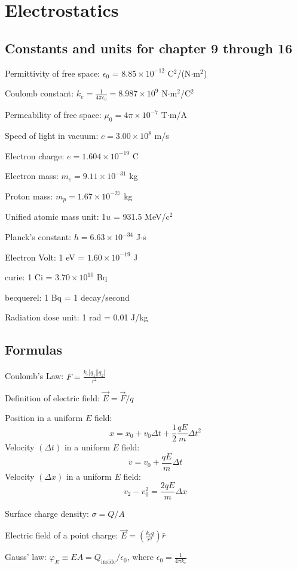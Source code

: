 \documentclass[../physics12.tex]{subfiles}
\begin{document}
\chapter{Electrostatics}
\section{Constants and units for chapter 9 through 16}
Permittivity of free space: $\epsilon_0$ = $8.85\times 10^{-12}$ C$^2$/(N$\cdot$m$^2$)

Coulomb constant: $k_e = \frac{1}{4\pi\epsilon_0} = 8.987\times 10^9$ N$\cdot$m$^2$/C$^2$

Permeability of free space: $\mu_0 = 4\pi\times 10^{-7}$ T$\cdot$m/A 

Speed of light in vacuum: $c=3.00\times 10^8$ m/s 

Electron charge: $e=1.604\times 10^{-19}$ C 

Electron mass: $m_e = 9.11\times 10^{-31}$ kg 

Proton mass: $m_p = 1.67\times 10^{-27}$ kg 

Unified atomic mass unit: 1$u$ = 931.5 MeV/c$^2$

Planck's constant: $h=6.63\times 10^{-34}$ J$\cdot$s 

Electron Volt: 1 eV = $1.60\times 10^{-19}$ J 

curie: 1 Ci = $3.70\times 10^{10}$ Bq 

becquerel: 1 Bq = 1 decay/second 

Radiation dose unit: 1 rad = 0.01 J/kg
\section{Formulas}
Coulomb's Law: $F=\frac{k_e |q_1||q_2|}{r^2}$

Definition of electric field: $\vec{E}=\vec{F}/q$

Position in a uniform $E$ field: 
\[ x = x_0 + v_0\Delta t + \frac{1}{2}\frac{qE}{m}\Delta t^2 \]
Velocity $(\Delta t)$ in a uniform $E$ field:
\[ v = v_0 + \frac{qE}{m}\Delta t \]
Velocity $(\Delta x)$ in a uniform $E$ field:
\[ v_2-v_0^2 = \frac{2qE}{m}\Delta x\]

Surface charge density: $\sigma = Q/A$

Electric field of a point charge: $\vec{E}=\left(\frac{k_e q}{r^2}\right)\hat{r}$

Gauss' law: $\varphi_E \equiv EA = Q_{\text{inside}}/\epsilon_0$, where $\epsilon_0 = \frac{1}{4\pi k_e}$
\end{document}
